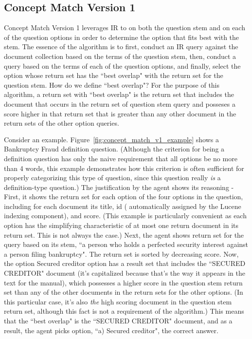 \subsection{Concept Match Version 1}

Concept Match Version 1 leverages IR to on both the question stem and on each of the question options in order to determine the option that fits best with the stem.  The essence of the algorithm is to first, conduct an IR query against the document collection based on the terms of the question stem, then, conduct a query based on the terms of each of the question options, and finally, select the option whose return set has the ``best overlap" with the return set for the question stem.  How do we define ``best overlap"?  For the purpose of this algorithm, a return set with ``best overlap" is the return set that includes the document that occurs in the return set of question stem query and posseses a score higher in that return set that is greater than any other document in the return sets of the other option queries.

Consider an example.  Figure~\ref{fig:concept_match_v1_example} shows a Bankruptcy Fraud definition question.  (Although the criterion for being a definition question has only the naive requirement that all options be no more than 4 words, this example demonstrates how this criterion is often sufficient for properly categorizing this type of question, since this question really \emph{is} a definition-type question.)  The justification by the agent shows its reasoning - First, it shows the return set for each option of the four options in the question, including for each document its title, id ( automatically assigned by the Lucene indexing component), and score.  (This example is particularly convenient as each option has the simplifying characteristic of at most one return document in its return set.  This is not always the case.)  Next, the agent shows return set for the query based on its stem, ``a person who holds a perfected security interest against a person filing bankruptcy".  The return set is sorted by decreasing score.  Now, the option Secured creditor option has a result set that includes the ``SECURED CREDITOR" document (it's capitalized because that's the way it appears in the text for the manual), which possesses a higher score in the question stem return set than any of the other documents in the return sets for the other options.  (In this particular case, it's also \emph{the} high scoring document in the question stem return set, although this fact is not a requirement of the algorithm.)  This means that the ``best overlap" is the ``SECURED CREDITOR" document, and as a result, the agent picks option, ``a) Secured creditor", the correct answer.

